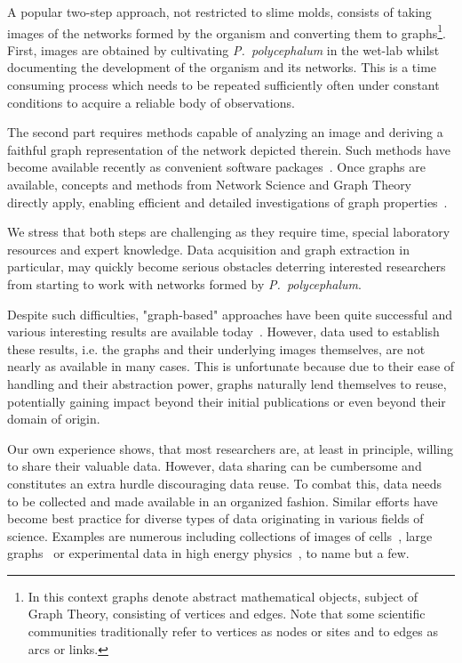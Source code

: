  	A popular two-step approach, not restricted to slime molds, consists of taking images of the networks formed by the organism and converting them to graphs\footnote{In this context graphs denote abstract mathematical objects, subject of Graph Theory, consisting of vertices and edges. Note that some scientific communities traditionally refer to vertices as nodes or sites and to edges as arcs or links.}. First, images are obtained by cultivating \emph{P.~polycephalum} in the wet-lab whilst documenting the development of the organism and its networks. This is a time consuming process which needs to be repeated sufficiently often under constant conditions to acquire a reliable body of observations. 

 	The second part requires methods capable of analyzing an image and deriving a faithful graph representation of the network depicted therein. Such methods have become available recently as convenient software packages~\cite{dirnberger2015nefi}. Once graphs are available, concepts and methods from Network Science and Graph Theory directly apply, enabling efficient and detailed investigations of graph properties~\cite{baumgarten2012computational,heaton2012analysis}.

 	We stress that both steps are challenging as they require time, special laboratory resources and expert knowledge. Data acquisition and graph extraction in particular, may quickly become serious obstacles deterring interested researchers from starting to work with networks formed by \emph{P.~polycephalum}. 

 	Despite such difficulties, "graph-based" approaches have been quite successful and various interesting results are available today~\cite{baumgarten2010plasmodial,baumgarten2013functional,fessel2014analytical,fessel2012Physarum,ito2011characterization}. However, data used to establish these results, i.e. the graphs and their underlying images themselves, are not nearly as available in many cases. This is unfortunate because due to their ease of handling and their abstraction power, graphs naturally lend themselves to reuse, potentially gaining impact beyond their initial publications or even beyond their domain of origin.

 	Our own experience shows, that most researchers are, at least in principle, willing to share their valuable data. However, data sharing can be cumbersome and constitutes an extra hurdle discouraging data reuse. To combat this, data needs to be collected and made available in an organized fashion. Similar efforts have become best practice for diverse types of data originating in various fields of science. Examples are numerous including collections of images of cells~\cite{cell}, large graphs~\cite{snap} or experimental data in high energy physics~\cite{hepdata}, to name but a few.

